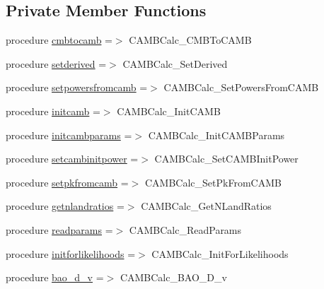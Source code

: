 \subsection*{Private Member Functions}
\begin{DoxyCompactItemize}
\item 
procedure \mbox{\hyperlink{structcalculator__camb_1_1camb__calculator_adc299f2cad2aae656c17159656ce9cb1}{cmbtocamb}} =$>$ C\+A\+M\+B\+Calc\+\_\+\+C\+M\+B\+To\+C\+A\+MB
\item 
procedure \mbox{\hyperlink{structcalculator__camb_1_1camb__calculator_adb5bb4a2b402b50c2c29906e8539df00}{setderived}} =$>$ C\+A\+M\+B\+Calc\+\_\+\+Set\+Derived
\item 
procedure \mbox{\hyperlink{structcalculator__camb_1_1camb__calculator_a7d768e1b511ed58e28bfaa64addd9cc9}{setpowersfromcamb}} =$>$ C\+A\+M\+B\+Calc\+\_\+\+Set\+Powers\+From\+C\+A\+MB
\item 
procedure \mbox{\hyperlink{structcalculator__camb_1_1camb__calculator_a5a7c953b41b6e0a7c0382daeff24b054}{initcamb}} =$>$ C\+A\+M\+B\+Calc\+\_\+\+Init\+C\+A\+MB
\item 
procedure \mbox{\hyperlink{structcalculator__camb_1_1camb__calculator_abe59a8c0f181f0ba0d48dd173dc28e3f}{initcambparams}} =$>$ C\+A\+M\+B\+Calc\+\_\+\+Init\+C\+A\+M\+B\+Params
\item 
procedure \mbox{\hyperlink{structcalculator__camb_1_1camb__calculator_a7f800f7df002287f99afd677b70a7e2f}{setcambinitpower}} =$>$ C\+A\+M\+B\+Calc\+\_\+\+Set\+C\+A\+M\+B\+Init\+Power
\item 
procedure \mbox{\hyperlink{structcalculator__camb_1_1camb__calculator_a682139dd52c824ea6e5947a7651e82f0}{setpkfromcamb}} =$>$ C\+A\+M\+B\+Calc\+\_\+\+Set\+Pk\+From\+C\+A\+MB
\item 
procedure \mbox{\hyperlink{structcalculator__camb_1_1camb__calculator_af16a54b35d5f2c76af634caa778939c7}{getnlandratios}} =$>$ C\+A\+M\+B\+Calc\+\_\+\+Get\+N\+Land\+Ratios
\item 
procedure \mbox{\hyperlink{structcalculator__camb_1_1camb__calculator_ad4b4c6cd047a72efd6745eaed0004468}{readparams}} =$>$ C\+A\+M\+B\+Calc\+\_\+\+Read\+Params
\item 
procedure \mbox{\hyperlink{structcalculator__camb_1_1camb__calculator_a852fde7d72d169604dec4b8e659351cb}{initforlikelihoods}} =$>$ C\+A\+M\+B\+Calc\+\_\+\+Init\+For\+Likelihoods
\item 
procedure \mbox{\hyperlink{structcalculator__camb_1_1camb__calculator_a0bad4eb522c9a4d53c421dfb1c4e966c}{bao\+\_\+d\+\_\+v}} =$>$ C\+A\+M\+B\+Calc\+\_\+\+B\+A\+O\+\_\+\+D\+\_\+v

\end{DoxyCompactItemize}
